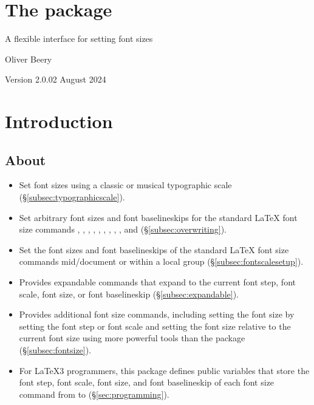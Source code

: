 \documentclass{beery}
\begin{document}
\section*
  {%
    The  package%
  }

A flexible interface for setting font sizes

Oliver Beery

Version 2.0.0\quad{}2 August 2024


\section{Introduction}
\label{sec:intro}

\subsection{About}
\label{subsec:about}

\begin{itemize}
  \item
  Set font sizes using a classic or musical typographic scale (\S\ref{subsec:typographicscale}).
  \item
  Set arbitrary font sizes and font baselineskips for the standard \LaTeX{} font size commands , , , , , , , , , and  (\S\ref{subsec:overwriting}).
  \item
  Set the font sizes and font baselineskips of the standard \LaTeX{} font size commands mid\-/document or within a local group (\S\ref{subsec:fontscalesetup}).
  \item
  Provides expandable commands that expand to the current font step, font scale, font size, or font baselineskip (\S\ref{subsec:expandable}).
  \item
  Provides additional font size commands, including setting the font size by setting the font step or font scale and setting the font size relative to the current font size using more powerful tools than the  package (\S\ref{subsec:fontsize}).
  \item
  For \LaTeX3 programmers, this package defines public  variables that store the font step, font scale, font size, and font baselineskip of each font size command from  to  (\S\ref{sec:programming}).
\end{itemize}
\end{document}
